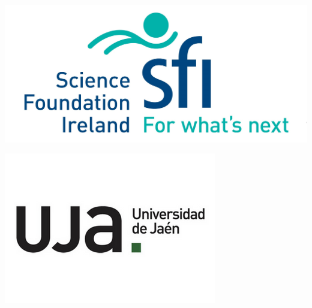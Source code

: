 \documentclass[11pt,oneside]{book}
\begin{document}
\begin{samepage}
            \begin{minipage}[c][0.21\linewidth][c]{0.21\linewidth}
        \includegraphics[width=\linewidth]{LT-EDI-2025/sponsor_logos/sfi.jpg}
      \end{minipage}\hspace{0.05\linewidth}
          \begin{minipage}[c][0.21\linewidth][c]{0.21\linewidth}
        \includegraphics[width=\linewidth]{LT-EDI-2025/sponsor_logos/uja.png}
      \end{minipage}\hspace{0.05\linewidth}
    
    \end{samepage}

  \bigskip
  \bigskip
\newpage
\end{document}
